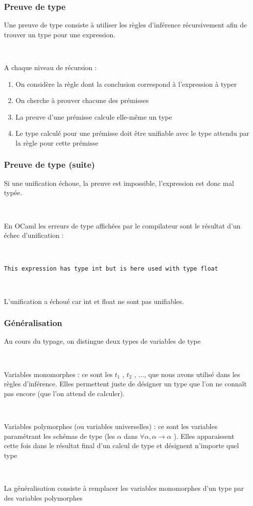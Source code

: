 \documentclass[handout,t]{beamer}
\begin{document}
\begin{frame}

\frametitle{Preuve de type}

Une preuve de type consiste à utiliser les règles d'inférence
récursivement afin de trouver un type pour une expression.

~

A chaque niveau de récursion :

\begin{enumerate}
\item On considère la règle dont la conclusion correspond à
l'expression à typer
\item On cherche à prouver chacune des prémisses
\item La preuve d'une prémisse calcule elle-même un type
\item Le type calculé pour une prémisse doit être unifiable avec le
type attendu par la règle pour cette prémisse
\end{enumerate}


\end{frame}

\begin{frame}

\frametitle{Preuve de type (suite)}


Si une unification échoue, la preuve est impossible, l'expression
est donc mal typée.

~

En OCaml les erreurs de type affichées par le compilateur sont
le résultat d'un échec d'unification :

~ 

\texttt{This
expression has type int but is here used with type float 
}

~

L'unification a échoué car
int
et
float
ne sont pas unifiables.


\end{frame}

\begin{frame}

\frametitle{Généralisation}

Au cours du typage, on distingue  deux types de
variables de type

~

Variables monomorphes : ce sont les $t_1$ , $t_2$ , $\ldots$, que nous avons
utilisé dans les règles d'inférence. Elles permettent juste de
désigner un type que l'on ne connaît pas encore (que l'on
attend de calculer).

~

Variables polymorphes (ou variables universelles) : ce sont les
variables paramétrant les schémas de type (les $\alpha$ dans
$\forall \alpha,\alpha\rightarrow \alpha$ ). Elles apparaissent cette fois dans le résultat final
d'un calcul de type et désignent n'importe quel type

~

La généralisation consiste à remplacer les variables
monomorphes d'un type par des variables polymorphes 


\end{frame}
\end{document}
